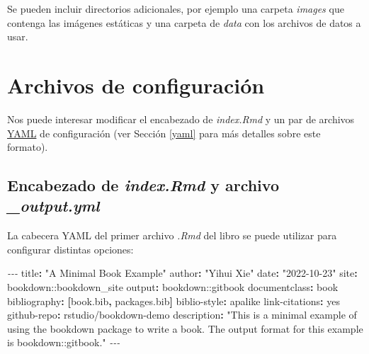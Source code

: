 \documentclass[
]{book}
\newenvironment{Shaded}{\begin{snugshade}}{\end{snugshade}}
\newcommand{\AttributeTok}[1]{\textcolor[rgb]{0.77,0.63,0.00}{#1}}
\newcommand{\CharTok}[1]{\textcolor[rgb]{0.31,0.60,0.02}{#1}}
\newcommand{\FunctionTok}[1]{\textcolor[rgb]{0.00,0.00,0.00}{#1}}
\newcommand{\KeywordTok}[1]{\textcolor[rgb]{0.13,0.29,0.53}{\textbf{#1}}}
\newcommand{\PreprocessorTok}[1]{\textcolor[rgb]{0.56,0.35,0.01}{\textit{#1}}}
\newcommand{\StringTok}[1]{\textcolor[rgb]{0.31,0.60,0.02}{#1}}
\theoremstyle{definition}
\theoremstyle{definition}
\theoremstyle{definition}
\theoremstyle{definition}
\theoremstyle{remark}
\begin{document}
Se pueden incluir directorios adicionales, por ejemplo una carpeta \emph{images} que contenga las
imágenes estáticas y una carpeta de \emph{data} con los archivos de datos a usar.

\hypertarget{archivos-de-configuraciuxf3n}{%
\chapter{Archivos de configuración}\label{archivos-de-configuraciuxf3n}}

Nos puede interesar modificar el encabezado de \emph{index.Rmd} y
un par de archivos \href{https://en.wikipedia.org/wiki/YAML}{YAML} de configuración
(ver Sección \ref{yaml} para más detalles sobre este formato).

\hypertarget{encabezado-de-index.rmd-y-archivo-_output.yml}{%
\section{\texorpdfstring{Encabezado de \emph{index.Rmd} y archivo \emph{\_output.yml}}{Encabezado de index.Rmd y archivo \_output.yml}}\label{encabezado-de-index.rmd-y-archivo-_output.yml}}

La cabecera YAML del primer archivo \emph{.Rmd} del libro se puede utilizar para configurar
distintas opciones:

\begin{Shaded}
\begin{Highlighting}[]
\PreprocessorTok{{-}{-}{-} }
\FunctionTok{title}\KeywordTok{:}\AttributeTok{ }\StringTok{"A Minimal Book Example"}
\FunctionTok{author}\KeywordTok{:}\AttributeTok{ }\StringTok{"Yihui Xie"}
\FunctionTok{date}\KeywordTok{:}\AttributeTok{ }\StringTok{"2022{-}10{-}23"}
\FunctionTok{site}\KeywordTok{:}\AttributeTok{ bookdown::bookdown\_site}
\FunctionTok{output}\KeywordTok{:}\AttributeTok{ bookdown::gitbook}
\FunctionTok{documentclass}\KeywordTok{:}\AttributeTok{ book}
\FunctionTok{bibliography}\KeywordTok{:}\AttributeTok{ }\KeywordTok{[}\AttributeTok{book.bib}\KeywordTok{,}\AttributeTok{ packages.bib}\KeywordTok{]}
\FunctionTok{biblio{-}style}\KeywordTok{:}\AttributeTok{ apalike}
\FunctionTok{link{-}citations}\KeywordTok{:}\AttributeTok{ }\CharTok{yes}
\FunctionTok{github{-}repo}\KeywordTok{:}\AttributeTok{ rstudio/bookdown{-}demo}
\FunctionTok{description}\KeywordTok{:}\AttributeTok{ }\StringTok{"This is a minimal example of using the bookdown package to write a book.}
\StringTok{The output format for this example is bookdown::gitbook."}
\PreprocessorTok{{-}{-}{-}}
\end{Highlighting}
\end{Shaded}
\end{document}
